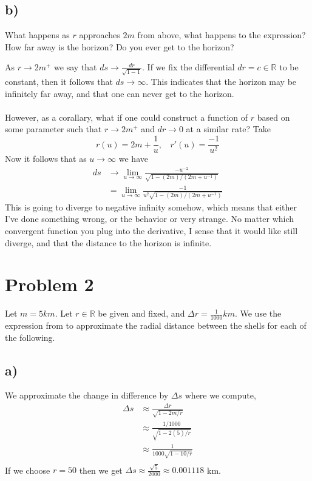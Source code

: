 \documentclass{article}
\theoremstyle{definition}
\begin{document}
\subsection*{b)}
\begin{mdframed}
    What happens as $r$ approaches $2m$ from above, what happens to the expression? How far away is the horizon?
    Do you ever get to the horizon?
\end{mdframed}
As $r \rightarrow 2m^+$ we say that $ds \rightarrow \frac{dr}{\sqrt{1 - 1}}$. If we fix the differential $dr = c \in \mathbb{R}$ to be constant, 
then it follows that $ds \rightarrow \infty$. This indicates that the horizon may be infinitely far away, and that one can never get to the horizon.
\\\\
However, as a corallary, what if one could construct a function of $r$ based on some parameter such that $r \rightarrow 2m^{+}$ and $dr \rightarrow 0$ at a similar rate?
Take 
\[
    r(u) = 2m + \frac{1}{u}, \ \ \ \ r'(u) = \frac{-1}{u^2}
\]
Now it follows that as $u \rightarrow \infty$ we have 
\begin{align*}
    ds &\rightarrow \lim_{u \rightarrow \infty}\frac{-u^{-2}}{\sqrt{1-(2m)/(2m + u^{-1})}}\\
    &= \lim_{u \rightarrow \infty} \frac{-1}{u^2\sqrt{1-(2m)/(2m + u^{-1})}}
\end{align*}
This is going to diverge to negative infinity somehow, which means that either I've done something wrong, or the behavior or very strange.
No matter which convergent function you plug into the derivative, I sense that it would like still diverge, and that the distance to the horizon is infinite.
\section*{Problem 2}
\begin{mdframed}
    Let $m = 5km$. Let $r \in \mathbb{R}$ be given and fixed, and $\Delta r = \frac{1}{1000} km$.
    We use the expression from  to approximate the radial distance between the shells for each of the following.
\end{mdframed}
\subsection*{a)}
We approximate the change in difference by $\Delta s$ where we compute,
\begin{align*}
    \Delta s &\approx \frac{\Delta r}{\sqrt{1 - 2m/r}}\\
    &\approx \frac{1/1000}{\sqrt{1 - 2(5)/r}} \\
    &\approx \frac{1}{1000\sqrt{1- 10/r}} \\
\end{align*}
If we choose $r = 50$ then we get $\Delta s \approx \frac{\sqrt{5}}{2000} \approx 0.001118$ km.
\end{document}
